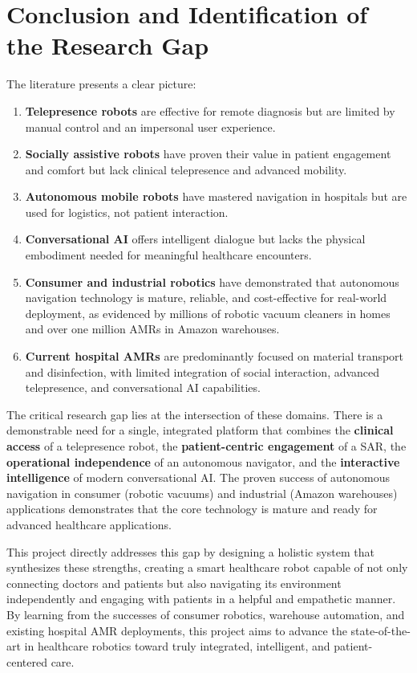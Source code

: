 \section{Conclusion and Identification of the Research Gap}



The literature presents a clear picture:
\begin{enumerate}
    \item \textbf{Telepresence robots} are effective for remote diagnosis but are limited by manual control and an impersonal user experience.
    \item \textbf{Socially assistive robots} have proven their value in patient engagement and comfort but lack clinical telepresence and advanced mobility.
    \item \textbf{Autonomous mobile robots} have mastered navigation in hospitals but are used for logistics, not patient interaction.
    \item \textbf{Conversational AI} offers intelligent dialogue but lacks the physical embodiment needed for meaningful healthcare encounters.
    \item \textbf{Consumer and industrial robotics} have demonstrated that autonomous navigation technology is mature, reliable, and cost-effective for real-world deployment, as evidenced by millions of robotic vacuum cleaners in homes and over one million AMRs in Amazon warehouses.
    \item \textbf{Current hospital AMRs} are predominantly focused on material transport and disinfection, with limited integration of social interaction, advanced telepresence, and conversational AI capabilities.
\end{enumerate}

The critical research gap lies at the intersection of these domains. There is a demonstrable need for a single, integrated platform that combines the \textbf{clinical access} of a telepresence robot, the \textbf{patient-centric engagement} of a SAR, the \textbf{operational independence} of an autonomous navigator, and the \textbf{interactive intelligence} of modern conversational AI. The proven success of autonomous navigation in consumer (robotic vacuums) and industrial (Amazon warehouses) applications demonstrates that the core technology is mature and ready for advanced healthcare applications.

This project directly addresses this gap by designing a holistic system that synthesizes these strengths, creating a smart healthcare robot capable of not only connecting doctors and patients but also navigating its environment independently and engaging with patients in a helpful and empathetic manner. By learning from the successes of consumer robotics, warehouse automation, and existing hospital AMR deployments, this project aims to advance the state-of-the-art in healthcare robotics toward truly integrated, intelligent, and patient-centered care.



